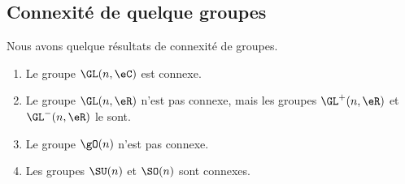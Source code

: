 \subsection{Connexité de quelque groupes}

\begin{proposition} \label{PropIFabDZz}
    Nous avons quelque résultats de connexité de groupes.
    \begin{enumerate}
        \item
            Le groupe \( \GL(n,\eC)\) est connexe.
        \item
            Le groupe \( \GL(n,\eR)\) n'est pas connexe, mais les groupes \( \GL^+(n,\eR)\) et \( \GL^-(n,\eR)\) le sont.
        \item
            Le groupe \( \gO(n)\) n'est pas connexe.
        \item
            Les groupes \( \SU(n)\) et \( \SO(n)\) sont connexes.
    \end{enumerate}
\end{proposition}
